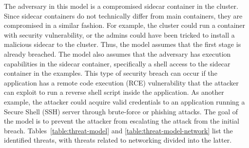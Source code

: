 \documentclass[english, 12pt, a4paper, sci, utf8, a-2b, online]{aaltothesis}
\begin{document}
The adversary in this model is a compromised sidecar container in the cluster.
Since sidecar containers do not technically differ from main containers, they are compromised in a similar fashion.
For example, the cluster could run a container with security vulnerability, or the admins could have been tricked to install a malicious sidecar to the cluster.
Thus, the model assumes that the first stage is already breached.
The model also assumes that the adversary has execution capabilities in the sidecar container, specifically a shell access to the sidecar container in the examples.
This type of security breach can occur if the application has a remote code execution (RCE) vulnerability that the attacker can exploit to run a reverse shell script inside the application.
As another example, the attacker could acquire valid credentials to an application running a Secure Shell (SSH) server through brute-force or phishing attacks.
The goal of the model is to prevent the attacker from escalating the attack from the initial breach.
Tables~\ref{table:threat-model} and \ref{table:threat-model-network} list the identified threats, with threats related to networking divided into the latter.
\end{document}
